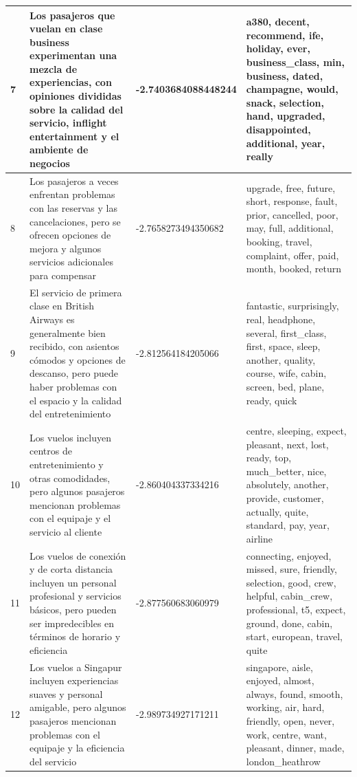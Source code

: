 \documentclass{report}
\begin{document}
{{\begin{longtable}{|p{1cm}|p{4cm}|p{4cm}|p{6cm}|}
                    \hline
                    7 & Los pasajeros que vuelan en clase business experimentan una mezcla de experiencias, con opiniones divididas sobre la calidad del servicio, inflight entertainment y el ambiente de negocios & -2.7403684088448244 & a380, decent, recommend, ife, holiday, ever, business\_class, min, business, dated, champagne, would, snack, selection, hand, upgraded, disappointed, additional, year, really \\
                    \hline
                    8 & Los pasajeros a veces enfrentan problemas con las reservas y las cancelaciones, pero se ofrecen opciones de mejora y algunos servicios adicionales para compensar & -2.7658273494350682 & upgrade, free, future, short, response, fault, prior, cancelled, poor, may, full, additional, booking, travel, complaint, offer, paid, month, booked, return \\
                    \hline
                    9 & El servicio de primera clase en British Airways es generalmente bien recibido, con asientos cómodos y opciones de descanso, pero puede haber problemas con el espacio y la calidad del entretenimiento & -2.812564184205066 & fantastic, surprisingly, real, headphone, several, first\_class, first, space, sleep, another, quality, course, wife, cabin, screen, bed, plane, ready, quick \\
                    \hline
                    10 & Los vuelos incluyen centros de entretenimiento y otras comodidades, pero algunos pasajeros mencionan problemas con el equipaje y el servicio al cliente & -2.860404337334216 & centre, sleeping, expect, pleasant, next, lost, ready, top, much\_better, nice, absolutely, another, provide, customer, actually, quite, standard, pay, year, airline \\
                    \hline
                    11 & Los vuelos de conexión y de corta distancia incluyen un personal profesional y servicios básicos, pero pueden ser impredecibles en términos de horario y eficiencia & -2.877560683060979 & connecting, enjoyed, missed, sure, friendly, selection, good, crew, helpful, cabin\_crew, professional, t5, expect, ground, done, cabin, start, european, travel, quite \\
                    \hline
                    12 & Los vuelos a Singapur incluyen experiencias suaves y personal amigable, pero algunos pasajeros mencionan problemas con el equipaje y la eficiencia del servicio & -2.989734927171211 & singapore, aisle, enjoyed, almost, always, found, smooth, working, air, hard, friendly, open, never, work, centre, want, pleasant, dinner, made, london\_heathrow \\

\end{longtable}}}
\end{document}
